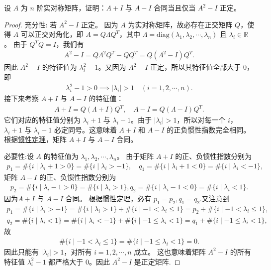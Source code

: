 \documentclass[../../main.tex]{subfiles}%
\begin{document}
\begin{example}
设 \(A\) 为 \(n\) 阶实对称矩阵，证明：\(A+I\) 与 \(A-I\) 合同当且仅当 \(A^2-I\) 正定。
\end{example}
\begin{proof}

{\heiti 充分性:} 若 \(A^2-I\) 正定。
因为 \(A\) 为实对称矩阵，故必存在正交矩阵 \(Q\)，使得 \(A\) 可以正交对角化，即 \(A = Q\Lambda Q^T\)，其中 \(\Lambda = \mathrm{diag}(\lambda_1, \lambda_2, \cdots, \lambda_n)\) 且 \(\lambda_i \in \mathbb{R}\)。
由于 \(Q^TQ = I\)，我们有
\begin{align*}
A^2 - I = Q\Lambda^2Q^T - QQ^T = Q(\Lambda^2 - I)Q^T.
\end{align*}
因此 \(A^2-I\) 的特征值为 \(\lambda_i^2 - 1\)。又因为 \(A^2-I\) 正定，所以其特征值全部大于 \(0\)，即
\begin{align*}
\lambda_i^2 - 1 > 0 \implies  |\lambda_i| > 1 \quad (i = 1, 2, \cdots, n).
\end{align*}
接下来考察 \(A+I\) 与 \(A-I\) 的特征值：
\begin{align*}
A+I = Q(\Lambda + I)Q^T, \quad A-I = Q(\Lambda - I)Q^T.
\end{align*}
它们对应的特征值分别为 \(\lambda_i + 1\) 与 \(\lambda_i - 1\)。由于 \(|\lambda_i| > 1\)，所以对每一个 \(i\)，\(\lambda_i + 1\) 与 \(\lambda_i - 1\) 必定同号。这意味着 \(A+I\) 和 \(A-I\) 的正负惯性指数完全相同。根据\hyperref[theorem:惯性定理]{惯性定理}，矩阵 \(A+I\) 与 \(A-I\) 合同。

{\heiti 必要性:}设 \(A\) 的特征值为 \(\lambda_1, \lambda_2, \cdots, \lambda_n\)。
由于矩阵 \(A+I\) 的正、负惯性指数分别为
\begin{align*}
p_1 = \#\{i \mid \lambda_i + 1 > 0\} = \#\{i \mid \lambda_i > -1\},\quad q_1= \#\{i \mid \lambda_i + 1 < 0\} = \#\{i \mid \lambda_i < -1\},
\end{align*}
矩阵 \(A-I\) 的正、负惯性指数分别为
\begin{align*}
p_2 = \#\{i \mid \lambda_i - 1 > 0\} = \#\{i \mid \lambda_i > 1\},q_2=\#\{i \mid \lambda_i - 1 < 0\} = \#\{i \mid \lambda_i < 1\}.
\end{align*}
因为\(A+I\) 与 \(A-I\) 合同。
根据\hyperref[theorem:惯性定理]{惯性定理}，必有 \(p_1 = p_2,q_1=q_2\).又注意到
\begin{gather*}
p_1=\#\{i \mid \lambda_i > -1\} = \#\{i \mid \lambda_i > 1\} + \#\{i \mid -1 < \lambda_i \leqslant 1\}=p_2+\#\{i \mid -1 < \lambda_i \leqslant 1\},
\\
q_2=\#\{i \mid \lambda_i < 1\} = \#\{i \mid \lambda_i < -1\} + \#\{i \mid -1 \leqslant \lambda_i < 1\}=q_1+\#\{i \mid -1 \leqslant \lambda_i < 1\},
\end{gather*}
故
\begin{align*}
\#\{i \mid -1 < \lambda_i \leqslant 1\} =\#\{i \mid -1 \leqslant \lambda_i < 1\}= 0.
\end{align*}
因此只能有 \(|\lambda_i| > 1\)，对所有 \(i=1, 2, \cdots, n\) 成立。
这也意味着矩阵 \(A^2 - I\) 的所有特征值 \(\lambda_i^2 - 1\) 都严格大于 \(0\)。因此 \(A^2 - I\) 是正定矩阵.
\end{proof}
\end{document}
